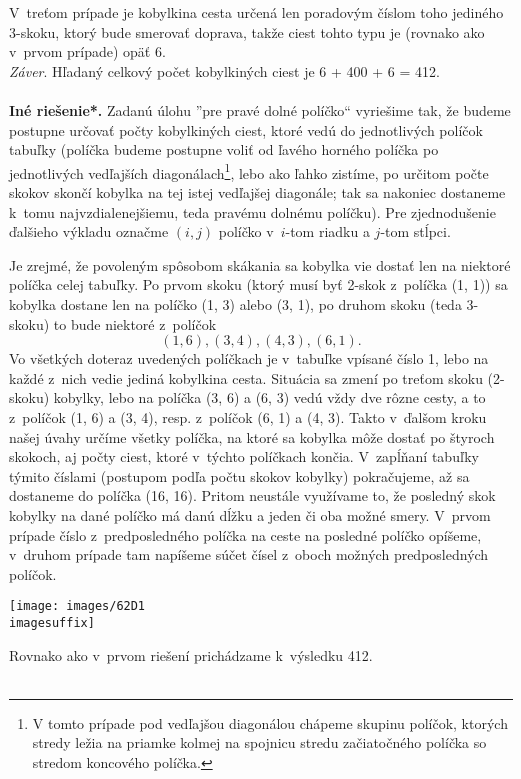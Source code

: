 {V~treťom prípade je kobylkina cesta určená len poradovým číslom toho jediného 3-skoku, ktorý bude smerovať doprava, takže ciest tohto typu je (rovnako ako v~prvom prípade) opäť 6.\\
\textit{Záver}. Hľadaný celkový počet kobylkiných ciest je 6 + 400 + 6 = 412.\\
\\
\textbf{Iné riešenie*.} Zadanú úlohu ”pre pravé dolné políčko“ vyriešime tak, že budeme postupne určovať počty kobylkiných ciest, ktoré vedú do jednotlivých políčok tabuľky (políčka budeme postupne voliť od ľavého horného políčka po jednotlivých vedľajších diagonálach\footnote{V tomto prípade pod vedľajšou diagonálou chápeme skupinu políčok, ktorých stredy ležia na priamke kolmej na spojnicu stredu začiatočného políčka so stredom koncového políčka.}, lebo ako ľahko zistíme, po určitom počte skokov skončí kobylka na tej istej vedľajšej diagonále; tak sa nakoniec dostaneme k~tomu najvzdialenejšiemu, teda pravému dolnému políčku). Pre zjednodušenie ďalšieho výkladu označme $(i, j)$ políčko v~$i$-tom riadku a $j$-tom stĺpci.

Je zrejmé, že povoleným spôsobom skákania sa kobylka vie dostať len na niektoré políčka celej tabuľky. Po prvom skoku (ktorý musí byť 2-skok z~políčka (1, 1)) sa kobylka dostane len na políčko (1, 3) alebo (3, 1), po druhom skoku (teda 3-skoku) to bude niektoré z~políčok
$$(1, 6), (3, 4), (4, 3), (6, 1).$$
Vo všetkých doteraz uvedených políčkach je v~tabuľke vpísané číslo 1, lebo na každé z~nich vedie jediná kobylkina cesta. Situácia sa zmení po treťom skoku (2-skoku) kobylky, lebo na políčka (3, 6) a (6, 3) vedú vždy dve rôzne cesty, a to z~políčok (1, 6) a (3, 4), resp. z~políčok (6, 1) a (4, 3). Takto v~ďalšom kroku našej úvahy určíme všetky políčka, na ktoré sa kobylka môže dostať po štyroch skokoch, aj počty ciest, ktoré v~týchto políčkach končia. V~zapĺňaní tabuľky týmito číslami (postupom podľa počtu skokov kobylky) pokračujeme, až sa dostaneme do  políčka (16, 16). Pritom neustále využívame to, že posledný skok kobylky na dané políčko má danú dĺžku a jeden či oba možné smery. V~prvom prípade číslo z~predposledného políčka na ceste na posledné políčko opíšeme, v~druhom prípade tam napíšeme súčet čísel z~oboch možných predposledných políčok.
\begin{center}
\texttt{[image: images/62D1\\imagesuffix]}
\end{center}
Rovnako ako v~prvom riešení prichádzame k~výsledku 412.\\
\\
}
